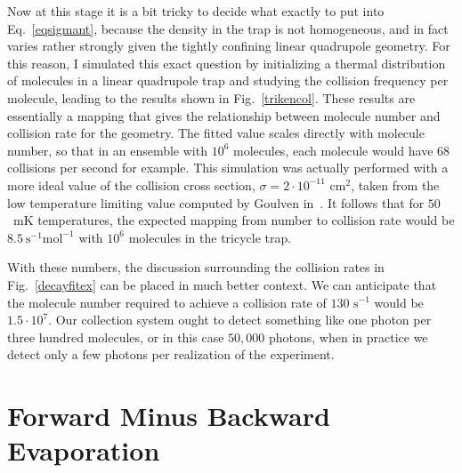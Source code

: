 Now at this stage it is a bit tricky to decide what exactly to put into Eq.~\ref{eqsigmant}, because the density in the trap is not homogeneous, and in fact varies rather strongly given the tightly confining linear quadrupole geometry.
For this reason, I simulated this exact question by initializing a thermal distribution of molecules in a linear quadrupole trap and studying the collision frequency per molecule, leading to the results shown in Fig.~\ref{trikencol}.
These results are essentially a mapping that gives the relationship between molecule number and collision rate for the geometry.
The fitted value scales directly with molecule number, so that in an ensemble with $10^6$ molecules, each molecule would have $68$ collisions per second for example.
This simulation was actually performed with a more ideal value of the collision cross section, $\sigma = 2\cdot10^{-11}\text{ cm}^2$, taken from the low temperature limiting value computed by Goulven in~\citep[Fig.~1b]{Stuhl2012evap}.
It follows that for $50$~mK temperatures, the expected mapping from number to collision rate would be $8.5~\text{s}^{-1}\text{mol}^{-1}$ with $10^6$ molecules in the tricycle trap.

With these numbers, the discussion surrounding the collision rates in Fig.~\ref{decayfitex} can be placed in much better context.
We can anticipate that the molecule number required to achieve a collision rate of $130\text{ s}^{-1}$ would be $1.5\cdot10^7$.
Our collection system ought to detect something like one photon per three hundred molecules, or in this case $50,000$ photons, when in practice we detect only a few photons per realization of the experiment.

\section{Forward Minus Backward Evaporation}

